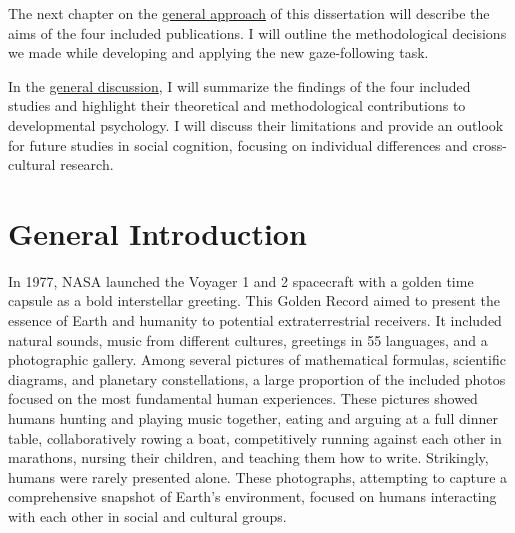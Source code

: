 \documentclass[
]{scrbook}
\begin{document}
The next chapter on the \hyperref[approach]{general approach} of this dissertation will describe the aims of the four included publications. I will outline the methodological decisions we made while developing and applying the new gaze-following task.

In the \hyperref[discussion]{general discussion}, I will summarize the findings of the four included studies and highlight their theoretical and methodological contributions to developmental psychology. I will discuss their limitations and provide an outlook for future studies in social cognition, focusing on individual differences and cross-cultural research.

\mainmatter

\chapter{General Introduction}\label{introduction}

In 1977, NASA launched the Voyager 1 and 2 spacecraft with a golden time capsule as a bold interstellar greeting. This Golden Record aimed to present the essence of Earth and humanity to potential extraterrestrial receivers. It included natural sounds, music from different cultures, greetings in 55 languages, and a photographic gallery. Among several pictures of mathematical formulas, scientific diagrams, and planetary constellations, a large proportion of the included photos focused on the most fundamental human experiences. These pictures showed humans hunting and playing music together, eating and arguing at a full dinner table, collaboratively rowing a boat, competitively running against each other in marathons, nursing their children, and teaching them how to write. Strikingly, humans were rarely presented alone. These photographs, attempting to capture a comprehensive snapshot of Earth's environment, focused on humans interacting with each other in social and cultural groups.
\end{document}
